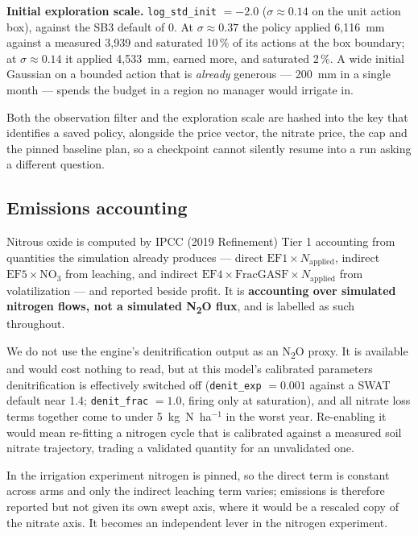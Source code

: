 \documentclass[a4paper,fleqn]{cas-sc}
\begin{document}
\textbf{Initial exploration scale.} \texttt{log\_std\_init} $= -2.0$
($\sigma \approx 0.14$ on the unit action box), against the SB3 default of 0. At
$\sigma \approx 0.37$ the policy applied 6{,}116~mm against a measured 3{,}939 and
saturated 10\,\% of its actions at the box boundary; at $\sigma \approx 0.14$ it applied
4{,}533~mm, earned more, and saturated 2\,\%. A wide initial Gaussian on a bounded action
that is \emph{already} generous --- 200~mm in a single month --- spends the budget in a
region no manager would irrigate in.

Both the observation filter and the exploration scale are hashed into the key that
identifies a saved policy, alongside the price vector, the nitrate price, the cap and
the pinned baseline plan, so a checkpoint cannot silently resume into a run asking a
different question.

\subsection{Emissions accounting}\label{sec:emissions}

Nitrous oxide is computed by IPCC (2019 Refinement) Tier 1 accounting
\citep{ipcc2019} from quantities the simulation already produces --- direct
$\mathrm{EF1} \times N_\mathrm{applied}$, indirect
$\mathrm{EF5} \times \mathrm{NO_3}$ from leaching, and indirect
$\mathrm{EF4} \times \mathrm{FracGASF} \times N_\mathrm{applied}$ from volatilization
--- and reported beside profit. It is \textbf{accounting over simulated nitrogen flows,
not a simulated N\textsubscript{2}O flux}, and is labelled as such throughout.

We do not use the engine's denitrification output as an N\textsubscript{2}O proxy. It is
available and would cost nothing to read, but at this model's calibrated parameters
denitrification is effectively switched off (\texttt{denit\_exp} $= 0.001$ against a SWAT
default near 1.4; \texttt{denit\_frac} $= 1.0$, firing only at saturation), and all
nitrate loss terms together come to under 5~kg~N~ha$^{-1}$ in the worst year. Re-enabling
it would mean re-fitting a nitrogen cycle that is calibrated against a measured soil
nitrate trajectory, trading a validated quantity for an unvalidated one.

In the irrigation experiment nitrogen is pinned, so the direct term is constant across
arms and only the indirect leaching term varies; emissions is therefore reported but not
given its own swept axis, where it would be a rescaled copy of the nitrate axis. It
becomes an independent lever in the nitrogen experiment.
\end{document}

